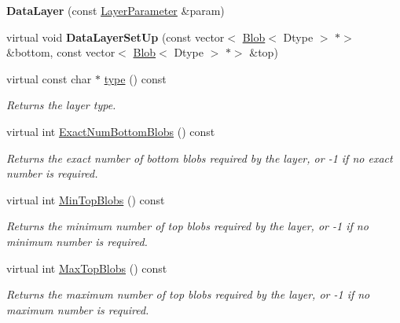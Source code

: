 \begin{DoxyCompactItemize}
\mbox{\label{classcaffe_1_1_data_layer_a55d92ba6737e695551eca610868f1fae}} 
{\bfseries Data\+Layer} (const \mbox{\hyperlink{classcaffe_1_1_layer_parameter}{Layer\+Parameter}} \&param)
\item 
\mbox{\label{classcaffe_1_1_data_layer_ae9ef80ae5a4925ea4362b22ae878e828}} 
virtual void {\bfseries Data\+Layer\+Set\+Up} (const vector$<$ \mbox{\hyperlink{classcaffe_1_1_blob}{Blob}}$<$ Dtype $>$ $\ast$$>$ \&bottom, const vector$<$ \mbox{\hyperlink{classcaffe_1_1_blob}{Blob}}$<$ Dtype $>$ $\ast$$>$ \&top)
\item 
\mbox{\label{classcaffe_1_1_data_layer_a6a5198f51cb51854be3d2d1e7891eeae}} 
virtual const char $\ast$ \mbox{\hyperlink{classcaffe_1_1_data_layer_a6a5198f51cb51854be3d2d1e7891eeae}{type}} () const
\begin{DoxyCompactList}\small\item\em Returns the layer type. \end{DoxyCompactList}\item 
virtual int \mbox{\hyperlink{classcaffe_1_1_data_layer_a2b6fa99ededf0863d8bab4a7a46addae}{Exact\+Num\+Bottom\+Blobs}} () const
\begin{DoxyCompactList}\small\item\em Returns the exact number of bottom blobs required by the layer, or -\/1 if no exact number is required. \end{DoxyCompactList}\item 
virtual int \mbox{\hyperlink{classcaffe_1_1_data_layer_ab0c5a7504085a6699272cdcfa8611887}{Min\+Top\+Blobs}} () const
\begin{DoxyCompactList}\small\item\em Returns the minimum number of top blobs required by the layer, or -\/1 if no minimum number is required. \end{DoxyCompactList}\item 
virtual int \mbox{\hyperlink{classcaffe_1_1_data_layer_ac47e9f3bff3db9d7364f6c392427745c}{Max\+Top\+Blobs}} () const
\begin{DoxyCompactList}\small\item\em Returns the maximum number of top blobs required by the layer, or -\/1 if no maximum number is required. \end{DoxyCompactList}\end{DoxyCompactItemize}

